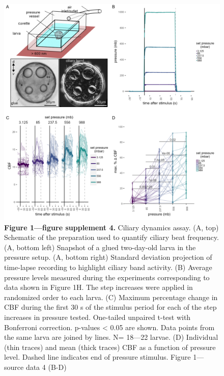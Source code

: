 \documentclass[
  11pt,
]{article}
\begin{document}
\begin{figure}[H]

{\centering \includegraphics[width=1\textwidth,height=\textheight]{Figures/Figure1-FigureSupplement4.png}

}

\caption{\textbf{Figure 1---figure supplement 4. } Ciliary dynamics
assay. (A, top) Schematic of the preparation used to quantify ciliary
beat frequency. (A, bottom left) Snapshot of a glued two-day-old larva
in the pressure setup. (A, bottom right) Standard deviation projection
of time-lapse recording to highlight ciliary band activity. (B) Average
pressure levels measured during the experiments corresponding to data
shown in Figure 1H. The step increases were applied in randomized order
to each larva. (C) Maximum percentage change in CBF during the first 30
s of the stimulus period for each of the step increases in pressure
tested. One-tailed unpaired t-test with Bonferroni correction. p-values
\textless{} 0.05 are shown. Data points from the same larva are joined
by lines. N= 18---22 larvae. (D) Individual (thin traces) and mean
(thick traces) CBF as a function of pressure level. Dashed line
indicates end of pressure stimulus. Figure 1---source data 4 (B-D)}

\end{figure}%
\end{document}
